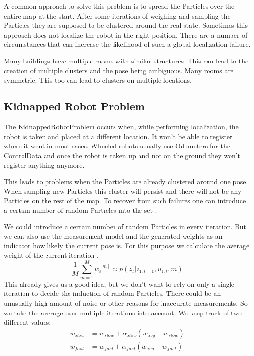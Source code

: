A common approach to solve this problem is to spread the \gls{Particle}s over the entire map at the start. After some iterations of weighing and sampling the \gls{Particle}s they are supposed to be clustered around the real state. Sometimes this approach does not localize the robot in the right position. There are a number of circumstances that can increase the likelihood of such a global localization failure.

Many buildings have multiple rooms with similar structures. This can lead to the creation of multiple clusters and the pose being ambiguous. Many rooms are symmetric. This too can lead to clusters on multiple locations. 
\subsection{Kidnapped Robot Problem} \label{sec:krp}
The \gls{KidnappedRobotProblem} occurs when, while performing localization, the robot is taken and placed at a different location. It won't be able to register where it went in most cases. Wheeled robots usually use \gls{Odometer}s for the \gls{ControlData} and once the robot is taken up and not on the ground they won't register anything anymore. 

This leads to problems when the \gls{Particle}s are already clustered around one pose. When sampling new \gls{Particle}s this cluster will persist and there will not be any \gls{Particle}s on the rest of the map. To recover from such failures one can introduce a certain number of random \gls{Particle}s into the set \citep[p.\ 256]{Thrun:2005:PR:1121596}.

We could introduce a certain number of random \gls{Particle}s in every iteration. But we can also use the measurement model and the generated weights as an indicator how likely the current pose is. For this purpose we calculate the average weight of the current iteration \citep[p.\ 257]{Thrun:2005:PR:1121596}.
\begin{equation}
\dfrac{1}{M}\sum_{m=1}^{M}w_t^{[m]} \approx p(z_t|z_{1:t-1},u_{1:t},m)
\end{equation}
This already gives us a good idea, but we don't want to rely on only a single iteration to decide the induction of random \gls{Particle}s. There could be an unusually high amount of noise or other reasons for inaccurate measurements. So we take the average over multiple iterations into account. We keep track of two different values:
\begin{equation}\label{eq:decay}
\begin{aligned}
w_{slow} &= w_{slow} + \alpha_{slow}(w_{avg}-w_{slow})\\
w_{fast} &= w_{fast} + \alpha_{fast}(w_{avg}-w_{fast})
\end{aligned}
\end{equation}

